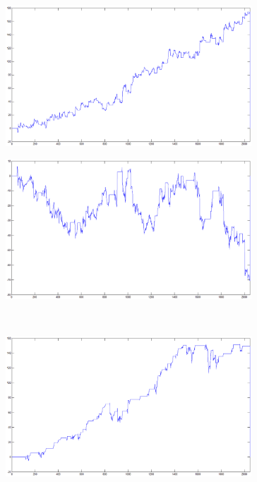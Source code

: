 \documentclass{tewiart}
\begin{document}
\FloatBarrier
\begin{figure}[h]
\centering
\begin{minipage}{.49\linewidth}
\centering
\includegraphics[width=0.82\textwidth]{images/fus500A.eps}
\label{jedno}
\end{minipage}
\begin{minipage}{.49\linewidth}
\centering
\includegraphics[width=0.82\textwidth]{images/fus500B.eps}
\label{dwu}
\end{minipage}
\\
\begin{minipage}{.49\linewidth}
\centering
\includegraphics[width=0.82\textwidth]{images/fus500C.eps}

\end{minipage}
\end{figure}
\end{document}
